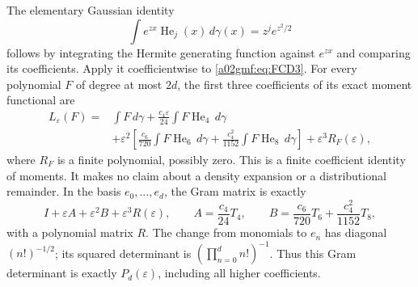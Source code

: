 The elementary Gaussian identity
\[
 \int e^{zx}\operatorname{He}_j(x)\,d\gamma(x)
       =z^j e^{z^2/2}
\]
follows by integrating the Hermite generating function against \(e^{zx}\)
and comparing its coefficients. Apply it coefficientwise to
\eqref{a02gmf:eq:FCD3}. For every polynomial \(F\) of degree at most \(2d\),
the first three coefficients of its exact moment functional are
\[
 \begin{split}
 L_\varepsilon(F)
 ={}&\int F\,d\gamma
       +\frac{c_4\varepsilon}{24}
                       \int F\operatorname{He}_4\,d\gamma\\
   &+\varepsilon^2\left[
        \frac{c_6}{720}\int F\operatorname{He}_6\,d\gamma
       +\frac{c_4^2}{1152}\int F\operatorname{He}_8\,d\gamma
                         \right]+\varepsilon^3 R_F(\varepsilon),
 \end{split}
\]
where \(R_F\) is a finite polynomial, possibly zero. This is a
finite coefficient identity of moments. It makes no claim about a
density expansion or a distributional remainder.
In the basis \(e_0,\ldots,e_d\), the Gram matrix is exactly
\[
 I+\varepsilon A+\varepsilon^2 B+\varepsilon^3 R(\varepsilon),
 \qquad
 A=\frac{c_4}{24}T_4,\qquad
 B=\frac{c_6}{720}T_6+\frac{c_4^2}{1152}T_8,
\]
with a polynomial matrix \(R\).
The change from monomials to \(e_n\) has diagonal
\((n!)^{-1/2}\); its squared determinant is
\((\prod_{n=0}^d n!)^{-1}\). Thus this Gram determinant is exactly
\(P_d(\varepsilon)\), including all higher coefficients.

